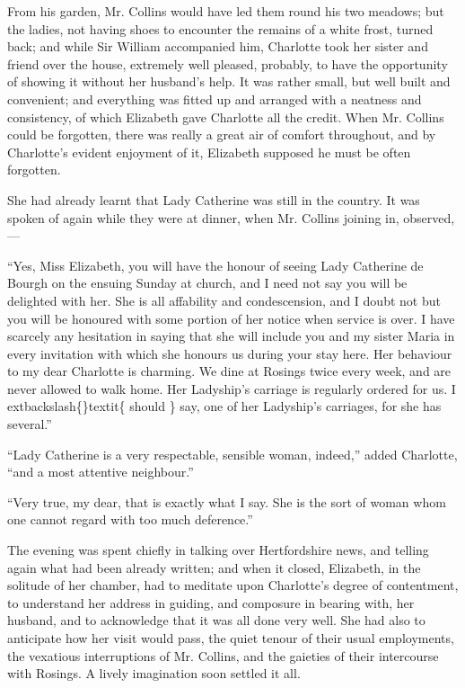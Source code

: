 \documentclass[10pt]{book}
\begin{document}
   From his garden, Mr. Collins would have led them round his two meadows;
but the ladies, not having shoes to encounter the remains of a white
frost, turned back; and while Sir William accompanied him, Charlotte
took her sister and friend over the house, extremely well pleased,
probably, to have the opportunity of showing it without her husband’s
help. It was rather small, but well built and convenient; and everything
was fitted up and arranged with a neatness and consistency, of which
Elizabeth gave Charlotte all the credit. When Mr. Collins could be
forgotten, there was really a great air of comfort
   throughout, and by
Charlotte’s evident enjoyment of it, Elizabeth supposed he must be often
forgotten.
  

   She had already learnt that Lady Catherine was still in the country. It
was spoken of again while they were at dinner, when Mr. Collins joining
in, observed,—
  

   “Yes, Miss Elizabeth, you will have the honour of seeing Lady Catherine
de Bourgh on the ensuing Sunday at church, and I need not say you will
be delighted with her. She is all affability and condescension, and I
doubt not but you will be honoured with some portion of her notice when
service is over. I have scarcely any hesitation in saying that she will
include you and my sister Maria in every invitation with which she
honours us during your stay here. Her behaviour to my dear Charlotte is
charming. We dine at Rosings twice every week, and are never allowed to
walk home. Her Ladyship’s carriage is regularly ordered for us. I
   	extbackslash\{\}textit\{
    should
   \}
   say, one of her Ladyship’s carriages, for she has several.”
  

   “Lady Catherine is a very respectable, sensible woman, indeed,” added
Charlotte, “and a most attentive neighbour.”
  

   “Very true, my dear, that is exactly what I say. She is the sort of
woman whom one cannot regard with too much deference.”
  

   The evening was spent chiefly in talking over Hertfordshire news, and
telling again what had been already written; and when it closed,
Elizabeth, in the solitude of her chamber, had to meditate upon
Charlotte’s degree of contentment, to understand her address in guiding,
and composure in bearing with, her husband, and to acknowledge that it
was all done very well. She had also to anticipate how her visit would
pass, the quiet tenour of their usual employments, the vexatious
interruptions of
   Mr. Collins, and the gaieties of their intercourse
with Rosings. A lively imagination soon settled it all.
  
\end{document}

